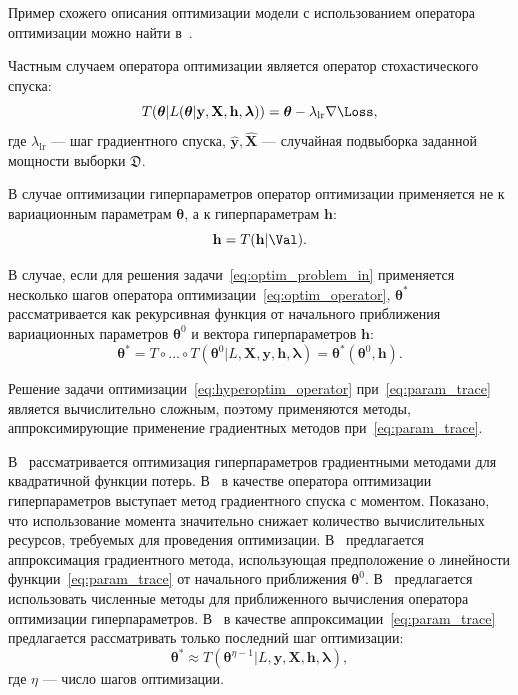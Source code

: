 Пример схожего описания оптимизации модели с использованием оператора оптимизации можно найти в~\cite{early}.

Частным случаем оператора оптимизации является оператор стохастического спуска:
\begin{equation}
\label{eq:sgd_operator}
    T(\boldsymbol{\theta} |L(\boldsymbol{\theta} |\mathbf{y},\mathbf{X},\mathbf{h},\boldsymbol{\lambda})) = \boldsymbol{\theta} - \lambda_{\text{lr}} \nabla \Loss,
\end{equation}
где $\lambda_{\text{lr}}$ --- шаг градиентного спуска, $\hat{\mathbf{y}}, \hat{\mathbf{X}}$ --- случайная подвыборка заданной мощности выборки $\mathfrak{D}$.

В случае оптимизации гиперпараметров оператор оптимизации применяется не к вариационным параметрам $\boldsymbol{\theta}$, а к гиперпараметрам $\mathbf{h}$:
\begin{equation}
\label{eq:hyperoptim_operator}
    \mathbf{h} = T(\mathbf{h} | \Val).
\end{equation}

В случае, если для решения задачи~\eqref{eq:optim_problem_in} применяется несколько шагов оператора оптимизации~\eqref{eq:optim_operator},
$\boldsymbol{\theta}^{*}$ рассматривается как рекурсивная функция от начального приближения вариационных параметров $\boldsymbol{\theta}^{0}$ и вектора гиперпараметров $\mathbf{h}$:
\begin{equation}
\label{eq:param_trace}
    \boldsymbol{\theta}^{*} = T \circ \dots \circ T(\boldsymbol{\theta}^0 | L, \mathbf{X}, \mathbf{y},  \mathbf{h}, \boldsymbol{\lambda}) = \boldsymbol{\theta}^{*}(\boldsymbol{\theta}^{0}, \mathbf{h}).
\end{equation}

Решение задачи оптимизации~\eqref{eq:hyperoptim_operator} при~\eqref{eq:param_trace} является вычислительно сложным, поэтому применяются методы, аппроксимирующие применение градиентных методов при~\eqref{eq:param_trace}.

В~\cite{hyper_bengio} рассматривается оптимизация гиперпараметров градиентными методами для квадратичной функции потерь. В~\cite{hyper} в качестве оператора оптимизации гиперпараметров выступает метод градиентного спуска с моментом. Показано, что использование момента значительно снижает количество вычислительных ресурсов, требуемых для проведения оптимизации. В~\cite{hyper_mad} предлагается аппроксимация градиентного метода, использующая предположение о линейности функции~\eqref{eq:param_trace} от начального приближения $\boldsymbol{\theta}^0$. В~\cite{hyper_hoag} предлагается использовать численные методы для приближенного вычисления оператора оптимизации гиперпараметров. В~\cite{greed_hyper} в качестве аппроксимации~\eqref{eq:param_trace} предлагается рассматривать только последний шаг оптимизации:
\[
    \boldsymbol{\theta}^{*} \approx T(\boldsymbol{\theta}^{\eta-1} | L, \mathbf{y}, \mathbf{X}, \mathbf{h}, \boldsymbol{\lambda}),
\]
где $\eta$ --- число шагов оптимизации.


